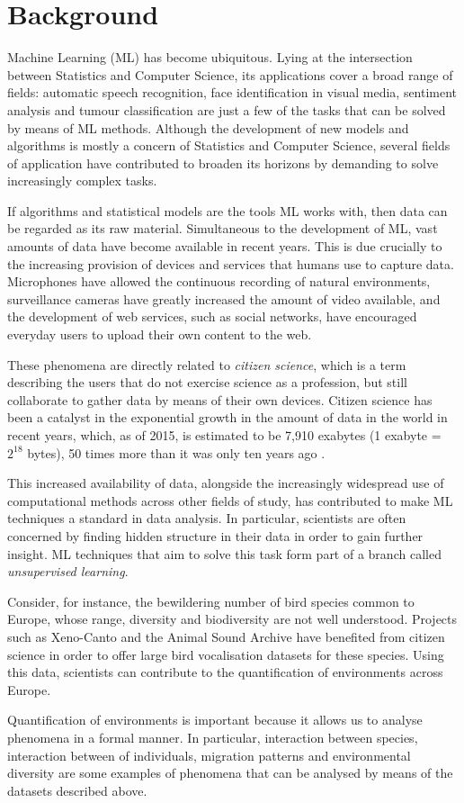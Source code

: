 \documentclass[../main.tex]{subfiles}
\begin{document}
 \label{chapter_intro}
\section{Background}
Machine Learning (ML) has become ubiquitous. Lying at the intersection between Statistics and Computer Science, its applications cover a broad range of fields: automatic speech recognition, face identification in visual media, sentiment analysis and tumour classification are just a few of the tasks that can be solved by means of ML methods. Although the development of new models and algorithms is mostly a concern of Statistics and Computer Science, several fields of application have contributed to broaden its horizons by demanding to solve increasingly complex tasks. 
\par If algorithms and statistical models are the tools ML works with, then data can be regarded as its raw material. Simultaneous to the development of ML, vast amounts of data have become available in recent years. This is due crucially to the increasing provision of devices and services that humans use to capture data. Microphones have allowed the continuous recording of natural environments, surveillance cameras have greatly increased the amount of video available, and the development of web services, such as social networks, have encouraged everyday users to upload their own content to the web. 
\par These phenomena are directly related to \emph{citizen science}, which is a term describing the users that do not exercise science as a profession, but still collaborate to gather data by means of their own devices. Citizen science has been a catalyst in the exponential growth in the amount of data in the world in recent years, which, as of 2015, is estimated to be 7,910 exabytes (1 exabyte = $2^{18}$ bytes), 50 times more than it was only ten years ago \cite{TheEconomistOnline2011}.
\par This increased availability of data, alongside the increasingly widespread use of computational methods across other fields of study, has contributed to make ML techniques a standard in data analysis. In particular, scientists are often concerned by finding hidden structure in their data in order to gain further insight. ML techniques that aim to solve this task form part of a branch called \emph{unsupervised learning}. 
\par Consider, for instance, the bewildering number of bird species common to Europe, whose range, diversity and biodiversity are not well understood. Projects such as Xeno-Canto \cite{Xeno-cantoFoundation2015} and the Animal Sound Archive \cite{AnimalSoundArchive2015} have benefited from citizen science in order to offer large bird vocalisation datasets for these species. Using this data, scientists can contribute to the quantification of environments across Europe.
\par Quantification of environments is important because it allows us to analyse phenomena in a formal manner. In particular, interaction between species, interaction between of individuals, migration patterns and environmental diversity are some examples of phenomena that can be analysed by means of the datasets described above.
\end{document}
